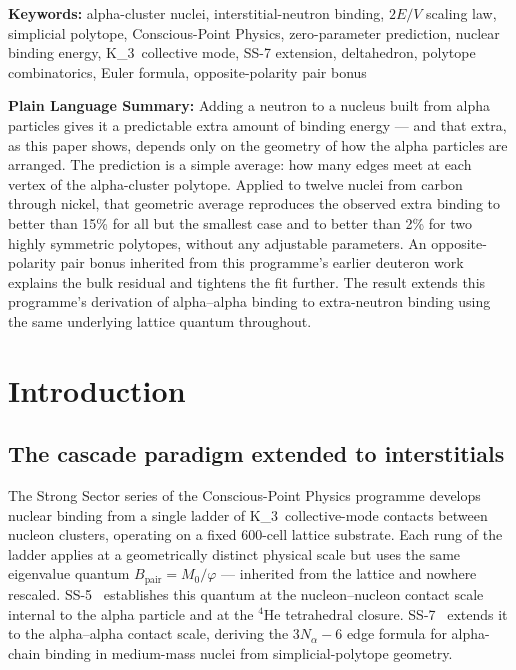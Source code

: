 \documentclass[11pt,letterpaper]{article}
\theoremstyle{definition}
\newcommand{\Mzero}{M_0}
\newcommand{\phig}{\varphi}
\newcommand{\Bpair}{B_{\text{pair}}}
\newcommand{\Nalpha}{N_\alpha}
\newcommand{\Kthree}{K_3}
\begin{document}
\medskip\noindent
\textbf{Keywords:} alpha-cluster nuclei, interstitial-neutron binding, $2E/V$ scaling law, simplicial polytope, Conscious-Point Physics, zero-parameter prediction, nuclear binding energy, \Kthree\ collective mode, SS-7 extension, deltahedron, polytope combinatorics, Euler formula, opposite-polarity pair bonus

\bigskip\noindent
\textbf{Plain Language Summary:} Adding a neutron to a nucleus built from alpha particles gives it a predictable extra amount of binding energy --- and that extra, as this paper shows, depends only on the geometry of how the alpha particles are arranged. The prediction is a simple average: how many edges meet at each vertex of the alpha-cluster polytope. Applied to twelve nuclei from carbon through nickel, that geometric average reproduces the observed extra binding to better than 15\% for all but the smallest case and to better than 2\% for two highly symmetric polytopes, without any adjustable parameters. An opposite-polarity pair bonus inherited from this programme's earlier deuteron work explains the bulk residual and tightens the fit further. The result extends this programme's derivation of alpha--alpha binding to extra-neutron binding using the same underlying lattice quantum throughout.

\bigskip
\raggedright
\tableofcontents
\newpage


\section{Introduction}
\label{sec:introduction}

\subsection{The cascade paradigm extended to interstitials}
\label{sec:cascade}

The Strong Sector series of the Conscious-Point Physics programme develops nuclear binding from a single ladder of \Kthree\ collective-mode contacts between nucleon clusters, operating on a fixed 600-cell lattice substrate. Each rung of the ladder applies at a geometrically distinct physical scale but uses the same eigenvalue quantum $\Bpair = \Mzero/\phig$ --- inherited from the lattice and nowhere rescaled. SS-5~\cite{abshier2026ss5} establishes this quantum at the nucleon--nucleon contact scale internal to the alpha particle and at the ${}^{4}\mathrm{He}$ tetrahedral closure. SS-7~\cite{abshier2026ss7} extends it to the alpha--alpha contact scale, deriving the $3\Nalpha - 6$ edge formula for alpha-chain binding in medium-mass nuclei from simplicial-polytope geometry.
\end{document}

